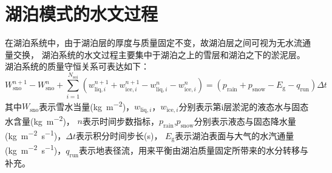 \section{湖泊模式的水文过程}\label{湖泊水文}
在湖泊系统中，由于湖泊层的厚度与质量固定不变，故湖泊层之间可视为无水流通量交换，
湖泊系统的水文过程主要集中于湖泊之上的雪层和湖泊之下的淤泥层。
湖泊系统的质量守恒关系可表达如下：
\begin{equation}
  W_{\mathrm{sno}}^{n+1}-W_{\mathrm{sno}}^{n}+\sum_{i=1}^{N_{\mathrm{s o i}}}\left(w_{\mathrm{liq},i}^{n+1}+w_{\mathrm{ice},i}^{n+1}-w_{\mathrm{liq},i}^{n}-w_{\mathrm{ice},i}^{n}\right)=\left(p_{\mathrm {rain}}+p_{\mathrm {snow}}-E_{\mathrm{g}}-q_{\mathrm{r u n}}\right) \Delta t
\end{equation}
其中$W_{\mathrm{sno}}$表示雪水当量(\unit{kg.m^{-2}})，$w_{\mathrm{liq},i}$，$w_{\mathrm{ice},i}$分别表示第i层淤泥的液态水与固态水含量(\unit{kg.m^{-2}})，
$n$表示时间步数指标，$p_{\mathrm {rain}} $,$p_{\mathrm {snow}} $分别表示液态与固态降水量(\unit{kg.m^{-2}.s^{-1}})，$\Delta t$表示积分时间步长(s)，
$E_{\mathrm {g}} $表示湖泊表面与大气的水汽通量(\unit{kg.m^{-2}.s^{-1}})，$q_{\mathrm{run}}$表示地表径流，用来平衡由湖泊质量固定所带来的水分转移与补充。


